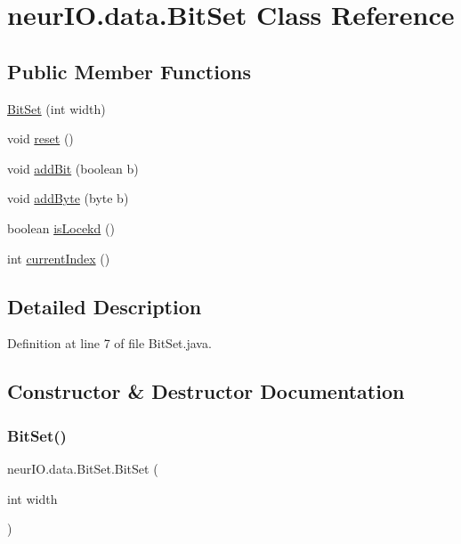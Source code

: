 \hypertarget{classneur_i_o_1_1data_1_1_bit_set}{}\section{neur\+I\+O.\+data.\+Bit\+Set Class Reference}
\label{classneur_i_o_1_1data_1_1_bit_set}
\subsection*{Public Member Functions}
\begin{DoxyCompactItemize}
\item 
\hyperlink{classneur_i_o_1_1data_1_1_bit_set_a425a3d991ae3bae79a20216914f0475b}{Bit\+Set} (int width)
\item 
void \hyperlink{classneur_i_o_1_1data_1_1_bit_set_af6f1dfe4ce5582a89dd327305d6d8f87}{reset} ()
\item 
void \hyperlink{classneur_i_o_1_1data_1_1_bit_set_a168de8cb6d3f39583c480859cefcc4e0}{add\+Bit} (boolean b)
\item 
void \hyperlink{classneur_i_o_1_1data_1_1_bit_set_a2d7d9ae61ce5ec45d924b150213ada2e}{add\+Byte} (byte b)
\item 
boolean \hyperlink{classneur_i_o_1_1data_1_1_bit_set_a4d57df84bc520d32429e6ae8ee4b2d9f}{is\+Locekd} ()
\item 
int \hyperlink{classneur_i_o_1_1data_1_1_bit_set_a92a69cf498204d16c617a76c6110a3fe}{current\+Index} ()
\end{DoxyCompactItemize}


\subsection{Detailed Description}


Definition at line 7 of file Bit\+Set.\+java.



\subsection{Constructor \& Destructor Documentation}
\mbox{\label{classneur_i_o_1_1data_1_1_bit_set_a425a3d991ae3bae79a20216914f0475b}} 
\subsubsection{\texorpdfstring{Bit\+Set()}{BitSet()}}
{\footnotesize\ttfamily neur\+I\+O.\+data.\+Bit\+Set.\+Bit\+Set (\begin{DoxyParamCaption}\item[{int}]{width }\end{DoxyParamCaption})}



